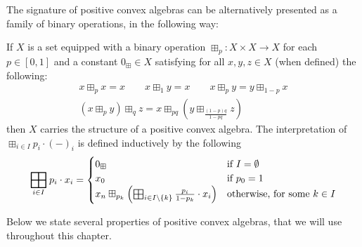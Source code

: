 The signature of positive convex algebras can be alternatively presented as a family of binary operations, in the following way:

\begin{proposition}\label{c4:prop:binary}
    If  $X$ is a set equipped with a binary operation $\boxplus_{p} : X \times X \to X$ for each $p \in [0,1]$ and a constant $0_\boxplus \in X$ satisfying for all $x,y,z \in X$ (when defined) the following:
    \begin{gather*}
        x \boxplus_{p} x = x \qquad x \boxplus_{1} y = x \qquad x \boxplus_{p} y = y \boxplus_{1-{p}} x \\ (x \boxplus_{p} y) \boxplus_{q} z = x \boxplus_{pq} \left(y \boxplus_{\frac{(1-p)q}{1-pq}} z\right)
    \end{gather*}
    then $X$ carries the structure of a positive convex algebra. The interpretation of $\boxplus_{i \in I} p_i \cdot (-)_{i}$ is defined inductively by the following
    $$\bigboxplus_{i \in I} p_i \cdot x_i = \begin{cases}
        0_\boxplus & \text{if } I = \emptyset \\
        x_0 & \text{if } p_0 = 1\\
        x_n \boxplus_{p_k} \left(\bigboxplus_{i \in I \setminus \{k\}} \frac{p_i}{1-{p_k}}\cdot x_i  \right) &\text{otherwise, for some } k \in I
    \end{cases} $$
\end{proposition}
Below we state several properties of positive convex algebras, that we will use throughout this chapter.
